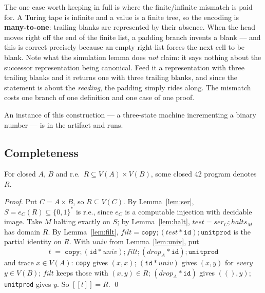 \documentclass[runningheads,envcountsame]{llncs}
\newcommand{\den}[1]{\ensuremath{[\![#1]\!]}}
\begin{document}
The one case worth keeping in full is where the finite/infinite mismatch is paid
for. A Turing tape is infinite and a value is a finite tree, so the encoding is
\textbf{many-to-one}: trailing blanks are represented by their absence. When the
head moves right off the end of the finite list, a padding branch invents a blank
--- and this is correct precisely because an empty right-list forces the next cell
to be blank. Note what the simulation lemma does \emph{not} claim: it says nothing
about the successor representation being canonical. Feed it a representation with
three trailing blanks and it returns one with three trailing blanks, and since the
statement is about the \emph{reading}, the padding simply rides along. The mismatch
costs one branch of one definition and one case of one proof.

An instance of this construction --- a three-state machine incrementing a binary
number --- is in the artifact and runs.

\subsection{Completeness}

\begin{theorem}\label{thm:complete}
For closed $A$, $B$ and r.e.\ $R \subseteq V(A) \times V(B)$, some closed 42
program denotes $R$.
\end{theorem}

\begin{proof}
Put $C = A \times B$, so $R \subseteq V(C)$. By Lemma~\ref{lem:ser},
$S = e_C(R) \subseteq \{0,1\}^*$ is r.e., since $e_C$ is a computable injection with
decidable image. Take $M$ halting exactly on $S$; by Lemma~\ref{lem:halt},
$\mathit{test} = \mathit{ser}_C \mathbin{;} \mathit{halts}_M$ has domain $R$. By
Lemma~\ref{lem:filt},
$\mathit{filt} = \texttt{copy} \mathbin{;} (\mathit{test} * \texttt{id}) \mathbin{;} \texttt{unitprod}$
is the partial identity on $R$. With $\mathit{univ}$ from Lemma~\ref{lem:univ}, put
\[
    t \;=\; \texttt{copy} \mathbin{;} (\texttt{id} * \mathit{univ}) \mathbin{;}
            \mathit{filt} \mathbin{;} (\mathit{drop}_A * \texttt{id}) \mathbin{;}
            \texttt{unitprod}
\]
and trace $x \in V(A)$: \texttt{copy} gives $(x,x)$; $(\texttt{id} * \mathit{univ})$
gives $(x,y)$ for \emph{every} $y \in V(B)$; $\mathit{filt}$ keeps those with
$(x,y) \in R$; $(\mathit{drop}_A * \texttt{id})$ gives $((),y)$; \texttt{unitprod}
gives $y$. So $\den{t} = R$. \qed
\end{proof}
\end{document}
